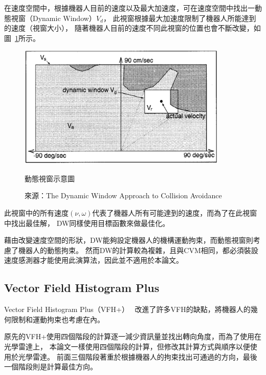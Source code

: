 在速度空間中，根據機器人目前的速度以及最大加速度，可在速度空間中找出一動態視窗（Dynamic Window）$V_d$，
此視窗根據最大加速度限制了機器人所能達到的速度（視窗大小），
隨著機器人目前的速度不同此視窗的位置也會不斷改變，如圖~\ref{f:dynamic_window}所示。
\begin{figure}[h!]
	\centering
	\includegraphics[width=10cm]{figures/algorithm/dynamic_window}
	\caption{動態視窗示意圖}
	\caption*{來源：The Dynamic Window Approach to Collision Avoidance}
	\label{f:dynamic_window}
\end{figure}
此視窗中的所有速度$(\nu,\omega)$代表了機器人所有可能達到的速度，而為了在此視窗中找出最佳解，
DW同樣使用目標函數來做最佳化。

藉由改變速度空間的形狀，DW能夠設定機器人的機構運動拘束，而動態視窗則考慮了機器人的動態拘束。
然而DW的計算較為複雜，且與CVM相同，都必須裝設速度感測器才能使用此演算法，因此並不適用於本論文。

\subsection{Vector Field Histogram Plus}
Vector Field Histogram Plus（VFH+）~\cite{Ulrich:1998:VFHPlus}
改進了許多VFH的缺點，將機器人的幾何限制和運動拘束也考慮在內。

原先的VFH+使用四個階段的計算逐一減少資訊量並找出轉向角度，而為了使用在光學雷達上，
本論文一樣使用四個階段的計算，但修改其計算方式與順序以便使用於光學雷達。
前面三個階段著重於根據機器人的拘束找出可通過的方向，最後一個階段則是計算最佳方向。

